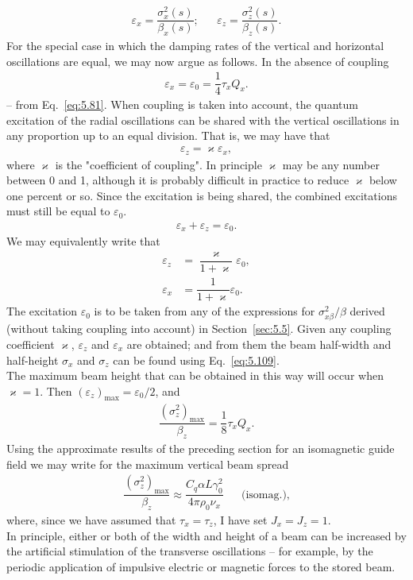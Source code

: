 \begin{align} \label{eq:5.109}
	\varepsilon_x = \dfrac{\sigma_x^2(s)}{\beta_x(s)}; && \varepsilon_z = \dfrac{\sigma_z^2(s)}{\beta_z(s)}.
\end{align}
For the special case in which the damping rates of the vertical and horizontal oscillations are equal, we may now argue as follows. In the absence of coupling
\begin{align}
	\varepsilon_x = \varepsilon_0 = \dfrac{1}{4} \tau_x Q_x.
\end{align}
-- from Eq.~\eqref{eq:5.81}. When coupling is taken into account, the quantum excitation of the radial oscillations can be shared with the vertical oscillations in any proportion up to an equal division. That is, we may have that
\begin{align}
	\varepsilon_z = \varkappa \varepsilon_x,
\end{align}
where $\varkappa$ is the "coefficient of coupling". In principle $\varkappa$ may be any number between
0 and 1, although it is probably difficult in practice to reduce $\varkappa$ below one percent or so. Since the excitation is being shared, the combined excitations must still be equal to $\varepsilon_0$.
\begin{align}
	\varepsilon_x + \varepsilon_z = \varepsilon_0.
\end{align}
We may equivalently write that
\begin{align}
	\varepsilon_z &= \dfrac{\varkappa}{1+\varkappa}\varepsilon_0,\\
    \varepsilon_x &= \dfrac{1}{1+\varkappa}\varepsilon_0.
\end{align}
The excitation $\varepsilon_0$ is to be taken from any of the expressions for $\sigma_{x\beta}^2/\beta$ derived (without taking coupling into account) in Section~\ref{sec:5.5}. Given any coupling coefficient $\varkappa$, $\varepsilon_z$ and $\varepsilon_x$ are obtained; and from them the beam half-width and half-height $\sigma_x$ and $\sigma_z$ can be found using Eq.~\eqref{eq:5.109}.\\
The maximum beam height that can be obtained in this way will occur when $\varkappa = 1$. Then $(\varepsilon_z)_\text{max} = \varepsilon_0/2$, and
\begin{align}
	\dfrac{(\sigma_z^2)_\text{max}}{\beta_z} = \dfrac{1}{8} \tau_x Q_x.
\end{align}
Using the approximate results of the preceding section for an isomagnetic guide field we may write for the maximum vertical beam spread
\begin{align}
	\dfrac{(\sigma_z^2)_\text{max}}{\beta_z} \approx \dfrac{C_q \alpha L \gamma_0^2}{4\pi\rho_0\nu_x} && \text{(isomag.)},
\end{align}
where, since we have assumed that $\tau_x = \tau_z$, I have set $J_x = J_z = 1$.\\
In principle, either or both of the width and height of a beam can be increased by the artificial stimulation of the transverse oscillations -- for example, by the periodic application of impulsive electric or magnetic forces to the stored beam.



